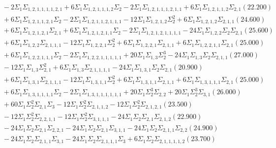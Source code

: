 \documentclass[12pt]{article}
\begin{document}
\begin{landscape}
\begin{align*}
		&\quad\quad -2\Sigma_{1}\Sigma_{1,2,1,1,1,1,2,1}+6\Sigma_{1}\Sigma_{1,2,1,1,1,2}\Sigma_{2}-2\Sigma_{1}\Sigma_{1,2,1,1,1,2,1,1}+6\Sigma_{1}\Sigma_{1,2,1,1,2}\Sigma_{2,1}(22.200) \\ 
		&\quad\quad +6\Sigma_{1}\Sigma_{1,2,1,1,2,1}\Sigma_{2}-2\Sigma_{1}\Sigma_{1,2,1,1,2,1,1,1}-12\Sigma_{1}\Sigma_{1,2,1,2}\Sigma_{2}^{2}+6\Sigma_{1}\Sigma_{1,2,1,2}\Sigma_{2,1,1}(24.600) \\ 
		&\quad\quad +6\Sigma_{1}\Sigma_{1,2,1,2,1}\Sigma_{2,1}+6\Sigma_{1}\Sigma_{1,2,1,2,1,1}\Sigma_{2}-2\Sigma_{1}\Sigma_{1,2,1,2,1,1,1,1}-24\Sigma_{1}\Sigma_{1,2,2}\Sigma_{2}\Sigma_{2,1}(25.600) \\ 
		&\quad\quad +6\Sigma_{1}\Sigma_{1,2,2}\Sigma_{2,1,1,1}-12\Sigma_{1}\Sigma_{1,2,2,1}\Sigma_{2}^{2}+6\Sigma_{1}\Sigma_{1,2,2,1}\Sigma_{2,1,1}+6\Sigma_{1}\Sigma_{1,2,2,1,1}\Sigma_{2,1}(25.000) \\ 
		&\quad\quad +6\Sigma_{1}\Sigma_{1,2,2,1,1,1}\Sigma_{2}-2\Sigma_{1}\Sigma_{1,2,2,1,1,1,1,1}+20\Sigma_{1}\Sigma_{1,3}\Sigma_{2}^{3}-24\Sigma_{1}\Sigma_{1,3}\Sigma_{2}\Sigma_{2,1,1}(27.000) \\ 
		&\quad\quad -12\Sigma_{1}\Sigma_{1,3}\Sigma_{2,1}^{2}+6\Sigma_{1}\Sigma_{1,3}\Sigma_{2,1,1,1,1}-24\Sigma_{1}\Sigma_{1,3,1}\Sigma_{2}\Sigma_{2,1}(20.900) \\ 
		&\quad\quad +6\Sigma_{1}\Sigma_{1,3,1}\Sigma_{2,1,1,1}-12\Sigma_{1}\Sigma_{1,3,1,1}\Sigma_{2}^{2}+6\Sigma_{1}\Sigma_{1,3,1,1}\Sigma_{2,1,1}+6\Sigma_{1}\Sigma_{1,3,1,1,1}\Sigma_{2,1}(25.000) \\ 
		&\quad\quad +6\Sigma_{1}\Sigma_{1,3,1,1,1,1}\Sigma_{2}-2\Sigma_{1}\Sigma_{1,3,1,1,1,1,1,1}+20\Sigma_{1}\Sigma_{2}^{3}\Sigma_{2,2}+20\Sigma_{1}\Sigma_{2}^{3}\Sigma_{3,1}(26.000) \\ 
		&\quad\quad +60\Sigma_{1}\Sigma_{2}^{2}\Sigma_{2,1}\Sigma_{3}-12\Sigma_{1}\Sigma_{2}^{2}\Sigma_{2,1,1,2}-12\Sigma_{1}\Sigma_{2}^{2}\Sigma_{2,1,2,1}(23.500) \\ 
		&\quad\quad -12\Sigma_{1}\Sigma_{2}^{2}\Sigma_{2,2,1,1}-12\Sigma_{1}\Sigma_{2}^{2}\Sigma_{3,1,1,1}-24\Sigma_{1}\Sigma_{2}\Sigma_{2,1}\Sigma_{2,1,2}(22.900) \\ 
		&\quad\quad -24\Sigma_{1}\Sigma_{2}\Sigma_{2,1}\Sigma_{2,2,1}-24\Sigma_{1}\Sigma_{2}\Sigma_{2,1}\Sigma_{3,1,1}-24\Sigma_{1}\Sigma_{2}\Sigma_{2,1,1}\Sigma_{2,2}(24.900) \\ 
		&\quad\quad -24\Sigma_{1}\Sigma_{2}\Sigma_{2,1,1}\Sigma_{3,1}-24\Sigma_{1}\Sigma_{2}\Sigma_{2,1,1,1}\Sigma_{3}+6\Sigma_{1}\Sigma_{2}\Sigma_{2,1,1,1,1,2}(23.700) \\ 

\end{align*}
\end{landscape}
\end{document}
